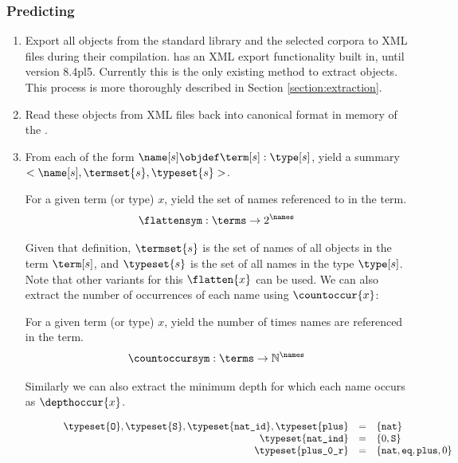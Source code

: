 \subsubsection{Predicting}
\begin{enumerate}
	\item Export all \coq objects from the standard library and the selected corpora to XML files during their compilation.
		\coq has an XML export functionality built in, until version 8.4pl5.
		Currently this is the only existing method to extract \coq objects.
		This process is more thoroughly described in Section \ref{section:extraction}.
	\item Read these objects from XML files back into canonical \acic{} format in memory of the \preloader.
	\item From each \coqobj[s] of the form $\name[s] \objdef \term[s] : \type[s]$,
		yield a summary $<\name[s], \termset{s}, \typeset{s}>$.
		\begin{definition}[$\flatten{x}$]
			For a given term (or type) $x$, yield the set of names referenced to in the term.
			\[ \flattensym : \terms \rightarrow 2^{\names} \]
		\end{definition}
		Given that definition, $\termset{s}$ is the set of names of all objects in the term $\term[s]$,
		and $\typeset{s}$ is the set of all names in the type $\type[s]$.
		Note that other variants for this $\flatten{x}$ can be used.
    We can also extract the number of occurrences of each name using $\countoccur{x}$:
    \begin{definition}[$\countoccur{x}$]
			For a given term (or type) $x$, yield the number of times names are referenced in the term.
      \[ \countoccursym : \terms \rightarrow \mathbb{N}^{\names} \]
    \end{definition}
    Similarly we can also extract the minimum depth for which each name occurs as $\depthoccur{x}$.
		\begin{figure}[H]
			\[
				\begin{array}{rcl}
					\typeset{\texttt{O}}, \typeset{\texttt{S}}, \typeset{\texttt{nat\_id}}, \typeset{\texttt{plus}} & = & \{ \texttt{nat} \}\\
					\typeset{\texttt{nat\_ind}} & = & \{ 0, \texttt{S} \} \\
					\typeset{\texttt{plus\_0\_r}} & = & \{ \texttt{nat}, \texttt{eq}, \texttt{plus}, 0 \} \\
					& & \\

\end{array}\]
\end{figure}
\end{enumerate}
